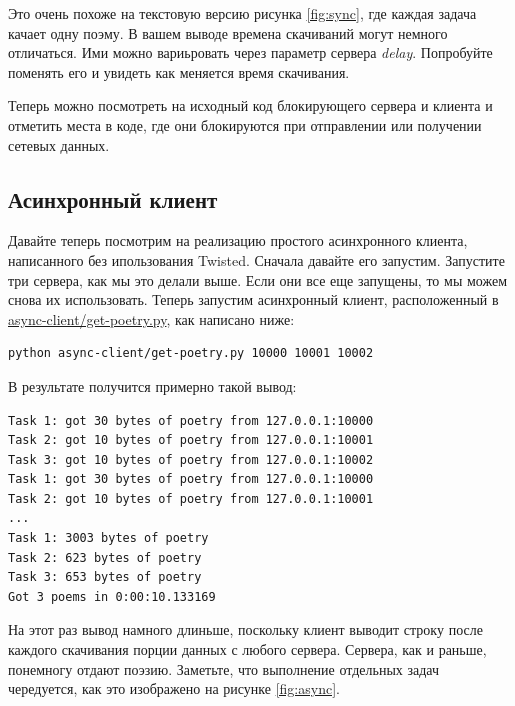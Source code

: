 Это очень похоже на текстовую версию рисунка \ref{fig:sync}, где 
каждая задача качает одну поэму. В вашем выводе времена скачиваний  
могут немного отличаться. Ими можно вариьровать через параметр сервера 
\textit{delay}. 
Попробуйте поменять его и увидеть как меняется время скачивания.


Теперь можно посмотреть на исходный код блокирующего сервера и 
клиента и отметить места в коде, где они блокируются при 
отправлении или получении сетевых данных.


\subsection{Асинхронный клиент}


    Давайте теперь посмотрим на реализацию простого 
асинхронного клиента, написанного без ипользования 
Twisted. Сначала давайте его запустим. Запустите три сервера, 
как мы это делали выше. 
Если они все еще запущены, то мы можем снова их 
использовать. Теперь запустим асинхронный клиент, 
расположенный в 
\href{http://github.com/jdavisp3/twisted-intro/blob/master/async-client/get-poetry.py}{async-client/get-poetry.py},  
как написано ниже:

\begin{scriptsize}\begin{verbatim}
python async-client/get-poetry.py 10000 10001 10002
\end{verbatim}\end{scriptsize}


В результате получится примерно такой вывод:

\begin{scriptsize}\begin{verbatim}
Task 1: got 30 bytes of poetry from 127.0.0.1:10000
Task 2: got 10 bytes of poetry from 127.0.0.1:10001
Task 3: got 10 bytes of poetry from 127.0.0.1:10002
Task 1: got 30 bytes of poetry from 127.0.0.1:10000
Task 2: got 10 bytes of poetry from 127.0.0.1:10001
...
Task 1: 3003 bytes of poetry
Task 2: 623 bytes of poetry
Task 3: 653 bytes of poetry
Got 3 poems in 0:00:10.133169
\end{verbatim}\end{scriptsize}

На этот раз вывод намного длиньше, поскольку клиент выводит 
строку после каждого скачивания порции данных с любого сервера. 
Сервера, как и раньше, понемногу отдают поэзию. 
Заметьте, что выполнение отдельных задач чередуется, как это изображено на 
рисунке \ref{fig:async}.


